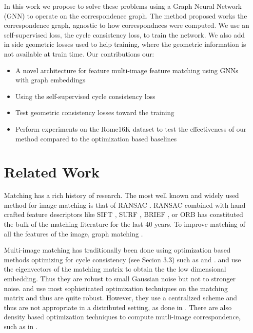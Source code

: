 \documentclass[10pt,twocolumn,letterpaper]{article}
\begin{document}
In this work we propose to solve these problems using a Graph Neural Network (GNN) to operate on the correspondence graph. The method proposed works the correspondence graph, agnostic to how correspondnces were computed. We use an self-supervised loss, the cycle consistency loss, to train the network. We also add in side geometric losses used to help training, where the geometric information is not available at train time.
Our contributions our:
\begin{itemize}
\item A novel architecture for feature multi-image feature matching using GNNs with graph embeddings
\item Using the self-supervised cycle consistency loss
\item Test geometric consistency losses toward the training
\item Perform experiments on the Rome16K \cite{li2010location} dataset to test the effectiveness of our method compared to the optimization based baselines
\end{itemize}


\section{Related Work}

Matching has a rich history of research.
The most well known and widely used method for image matching is that of RANSAC \cite{fischler1981random}.
RANSAC combined with hand-crafted feature descriptors like SIFT \cite{lowe2004distinctive}, SURF \cite{bay2006surf}, BRIEF \cite{calonder2012brief}, or ORB \cite{mur2015orb} has constituted the bulk of the matching literature for the last 40 years. To improve matching of all the features of the image, graph matching \cite{suh2015subgraph, hu2016distributable}.

Multi-image matching has traditionally been done using optimization based methods optimizing for cycle consistency (see Secion 3.3) such as \cite{pachauri2013solving,zhou2015multi,arrigoni2017synchronization} and \cite{wang2017multi}.
\cite{pachauri2013solving} and \cite{arrigoni2017synchronization} use the eigenvectors of the matching matrix to obtain the the low dimensional embedding. 
Thus they are robust to small Gaussian noise but not to stronger noise.
\cite{zhou2015multi} and \cite{wang2017multi} use most sophisticated optimization techniques on the matching matrix and thus are quite robust.
However, they use a centralized scheme and thus are not appropriate in a distributed setting,
as done in \cite{leonardos2016distributed}.
There are also density based optimization techniques to compute mutli-image correspondence, such as in \cite{tron2017fast}.
\end{document}
